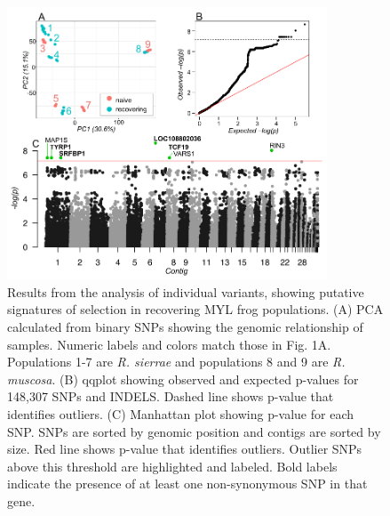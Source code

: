 \documentclass[9pt,twoside,lineno]{pnas-new}
\begin{document}
\begin{figure}

{\centering \includegraphics[width=0.85\textwidth]{figures/pca_qq_manhattan.png}

}

\caption{\label{fig-selectionresults}Results from the analysis of
individual variants, showing putative signatures of selection in
recovering MYL frog populations. (A) PCA calculated from binary SNPs
showing the genomic relationship of samples. Numeric labels and colors
match those in Fig. 1A. Populations 1-7 are
\emph{R. sierrae} and populations 8 and 9 are \emph{R. muscosa}. (B)
qqplot showing observed and expected p-values for 148,307 SNPs and
INDELS. Dashed line shows p-value that identifies outliers. (C)
Manhattan plot showing p-value for each SNP. SNPs are sorted by genomic
position and contigs are sorted by size. Red line shows p-value that
identifies outliers. Outlier SNPs above this threshold are highlighted
and labeled. Bold labels indicate the presence of at least one
non-synonymous SNP in that gene.}

\end{figure}\clearpage

\newpage
\end{document}
